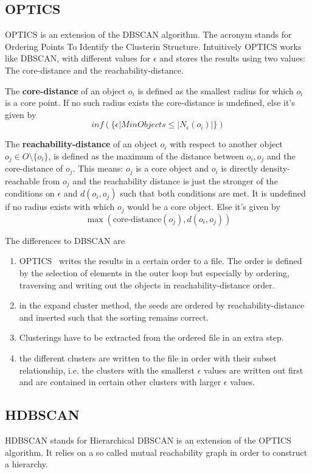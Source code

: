\subsection{OPTICS}\label{\positionnumber}
OPTICS is an extension of the DBSCAN algorithm. The acronym stands for Ordering Points To Identify the Clusterin Structure. Intuitively OPTICS works like DBSCAN, with different values for $\epsilon$ and stores the results using two values: The core-distance and the reachability-distance.

The \textbf{core-distance} of an object $o_i$ is defined as the smallest radius for which $o_i$ is a core point. If no such radius exists the core-distance is undefined, else it's given by  \[ inf(\{\epsilon | MinObjects \leq |N_\epsilon(o_i)| \})\]

The \textbf{reachability-distance} of an object $o_i$ with respect to another object $o_j \in O\setminus \{o_i\}$, is defined as the maximum of the distance between $o_i, o_j$ and the core-distance of $o_j$. This means: $o_j$ is a core object and $o_i$ is directly density-reachable from $o_j$ and the reachability distance is just the stronger of the conditions on $\epsilon$ and $d(o_i, o_j)$ such that both conditions are met. It is undefined if no radius exists with which $o_j$ would be a core object. Else it's given by \[ \max(\text{core-distance}(o_j), d(o_i, o_j)) \]

The differences to DBSCAN are 
\begin{enumerate}
    \item OPTICS~\cite{optics} writes the results in a certain order to a file. The order is defined by the selection of elements in the outer loop but especially by ordering, traversing and writing out the objects in reachability-distance order.
    \item in the expand cluster method, the seeds are ordered by reachability-distance and inserted such that the sorting remains correct.
    \item Clusterings have to be extracted from the ordered file in an extra step.
    \item the different clusters are written to the file in order with their subset relationship, i.e. the clusters with the smallerst $\epsilon$ values are written out first and are contained in certain other clusters with larger $\epsilon$ values.
\end{enumerate}

\subsection{HDBSCAN}\label{\positionnumber}
HDBSCAN\cite{hdbscan} stands for Hierarchical DBSCAN is an extension of the OPTICS algorithm. It relies on a so called mutual reachability graph in order to construct a hierarchy.\\

